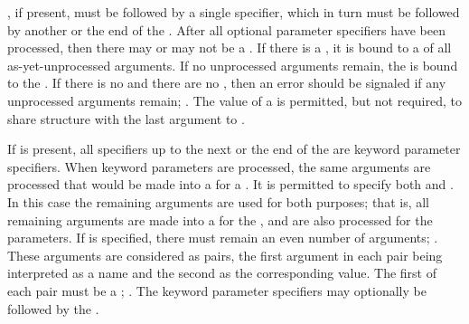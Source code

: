 \endsubsubsection%


, if present, must be followed by a single 
specifier, which in turn must be followed by another 
 or the end of the .  After all
optional parameter specifiers have been processed, then there may or
may not be a .  If there is a , it is
bound to a  of all as-yet-unprocessed arguments.  If
no unprocessed arguments remain, the  is bound to the
.  If there is no  and there are no 
, then an error 
should be signaled if
any unprocessed arguments remain; \seesection\FuncallErrorChecking.
The value of a 
is permitted, but not required, to share structure with the
last argument to .

\endsubsubsection%

                       
If  
is present, all specifiers up to the next 
or the end of the  are keyword parameter specifiers.
When keyword parameters are processed,
the same arguments are processed that
would be made into a  for a .
It is permitted to specify both  and .
In this case the remaining arguments are used for both purposes;
that is, all remaining arguments are made into a  for the
, and are also processed for the  parameters.
If  is specified, there must remain
an even number of arguments; \seesection\OddNumberOfKeyArgs.
These arguments are considered as pairs,
the first argument in each pair being interpreted as a name
and the second as the corresponding value.
The first  of each pair must be a ;
\seesection\InvalidKeyArgs.
The keyword parameter specifiers may optionally be followed by the
 .

